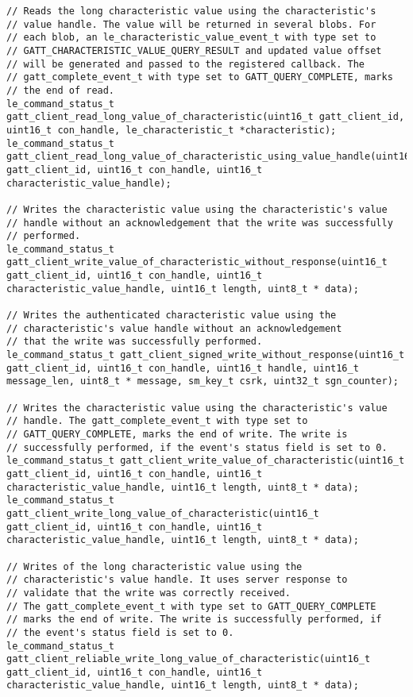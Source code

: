\begin{lstlisting}
// Reads the long characteristic value using the characteristic's 
// value handle. The value will be returned in several blobs. For 
// each blob, an le_characteristic_value_event_t with type set to 
// GATT_CHARACTERISTIC_VALUE_QUERY_RESULT and updated value offset
// will be generated and passed to the registered callback. The 
// gatt_complete_event_t with type set to GATT_QUERY_COMPLETE, marks
// the end of read.
le_command_status_t gatt_client_read_long_value_of_characteristic(uint16_t gatt_client_id, uint16_t con_handle, le_characteristic_t *characteristic);
le_command_status_t gatt_client_read_long_value_of_characteristic_using_value_handle(uint16_t gatt_client_id, uint16_t con_handle, uint16_t characteristic_value_handle);
    
// Writes the characteristic value using the characteristic's value
// handle without an acknowledgement that the write was successfully
// performed.
le_command_status_t gatt_client_write_value_of_characteristic_without_response(uint16_t gatt_client_id, uint16_t con_handle, uint16_t characteristic_value_handle, uint16_t length, uint8_t * data);

// Writes the authenticated characteristic value using the
// characteristic's value handle without an acknowledgement
// that the write was successfully performed.
le_command_status_t gatt_client_signed_write_without_response(uint16_t gatt_client_id, uint16_t con_handle, uint16_t handle, uint16_t message_len, uint8_t * message, sm_key_t csrk, uint32_t sgn_counter);

// Writes the characteristic value using the characteristic's value
// handle. The gatt_complete_event_t with type set to
// GATT_QUERY_COMPLETE, marks the end of write. The write is
// successfully performed, if the event's status field is set to 0.
le_command_status_t gatt_client_write_value_of_characteristic(uint16_t gatt_client_id, uint16_t con_handle, uint16_t characteristic_value_handle, uint16_t length, uint8_t * data);
le_command_status_t gatt_client_write_long_value_of_characteristic(uint16_t gatt_client_id, uint16_t con_handle, uint16_t characteristic_value_handle, uint16_t length, uint8_t * data);

// Writes of the long characteristic value using the
// characteristic's value handle. It uses server response to
// validate that the write was correctly received.
// The gatt_complete_event_t with type set to GATT_QUERY_COMPLETE
// marks the end of write. The write is successfully performed, if
// the event's status field is set to 0.
le_command_status_t gatt_client_reliable_write_long_value_of_characteristic(uint16_t gatt_client_id, uint16_t con_handle, uint16_t characteristic_value_handle, uint16_t length, uint8_t * data);


\end{lstlisting}
